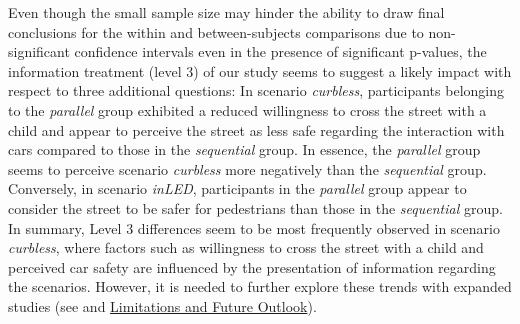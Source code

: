 Even though the small sample size may hinder the ability to draw final conclusions for the within and between-subjects comparisons due to non-significant confidence intervals even in the presence of significant p-values, the information treatment (level 3) of our study seems to suggest a likely impact with respect to three additional questions: In scenario \emph{curbless}, participants belonging to the \emph{parallel} group exhibited a reduced willingness to cross the street with a child and appear to perceive the street as less safe regarding the interaction with cars compared to those in the \emph{sequential} group. In essence, the \emph{parallel} group seems to perceive scenario \emph{curbless} more negatively than the \emph{sequential} group. Conversely, in scenario \emph{inLED}, participants in the \emph{parallel} group appear to consider the street to be safer for pedestrians than those in the \emph{sequential} group. In summary, Level 3 differences seem to be most frequently observed in scenario \emph{curbless}, where factors such as willingness to cross the street with a child and perceived car safety are influenced by the presentation of information regarding the scenarios. 
However, it is needed to further explore these trends with expanded studies (see  and \hyperref[subsec:limitations]{Limitations and Future Outlook}). 

